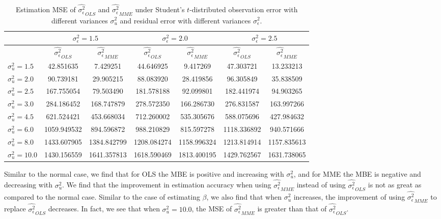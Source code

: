 \documentclass{article}
\begin{document}
\begin{table}[ht]
    \centering
    \caption{Estimation MSE of $\hat{\sigma^2_\epsilon}_{OLS}$ and $\hat{\sigma^2_\epsilon}_{MME}$ under Student's $t$-distributed observation error with different variances $\sigma^2_u$ and residual error with different variances $\sigma^2_\epsilon$.}
    \label{Tab:MSE_sigma_t}
    \begin{tabular}[t]{lcccccc}
        \hline
        &\multicolumn{2}{c}{$\sigma^2_\epsilon=1.5$}&\multicolumn{2}{c}{$\sigma^2_\epsilon=2.0$}&\multicolumn{2}{c}{$\sigma^2_\epsilon=2.5$}\\
        \hline
        &$\hat{\sigma^2_\epsilon}_{OLS}$&$\hat{\sigma^2_\epsilon}_{MME}$&$\hat{\sigma^2_\epsilon}_{OLS}$&
        $\hat{\sigma^2_\epsilon}_{MME}$&$\hat{\sigma^2_\epsilon}_{OLS}$&$\hat{\sigma^2_\epsilon}_{MME}$\\
        \hline
        $\sigma^2_u = 1.5$&42.851635&7.429251&44.646925&9.417269&47.303721&13.233213\\
        $\sigma^2_u = 2.0$&90.739181&29.905215&88.083920&28.419856&96.305849&35.838509\\
        $\sigma^2_u = 2.5$&167.755054&79.503490&181.578188&92.099801&182.441974&94.903265\\
        $\sigma^2_u = 3.0$&284.186452&168.747879&278.572350&166.286730&276.831587&163.997266\\
        $\sigma^2_u = 4.5$&621.524421&453.668034&712.260002&535.305676&588.075696&427.984632\\
        $\sigma^2_u = 6.0$&1059.949532&894.596872&988.210829&815.597278&1118.336892&940.571666\\
        $\sigma^2_u = 8.0$&1433.607905&1384.842799&1208.084274&1158.996324&1213.814914&1157.835613\\
        $\sigma^2_u = 10.0$&1430.156559&1641.357813&1618.590469&1813.400195&1429.762567&1631.738065\\
        \hline
    \end{tabular}
\end{table}

Similar to the normal case, we find that for OLS the MBE is positive and increasing with $\sigma^2_u$, and for MME the MBE is negative and decreasing with $\sigma^2_u$.
We find that the improvement in estimation accuracy when using $\hat{\sigma^2_\epsilon}_{MME}$ instead of using $\hat{\sigma^2_\epsilon}_{OLS}$ is not as great as compared to the normal case.
Similar to the case of estimating $\beta$, we also find that when $\sigma^2_u$ increases, the improvement of using $\hat{\sigma^2_\epsilon}_{MME}$ to replace $\hat{\sigma^2_\epsilon}_{OLS}$ decreases.
In fact, we see that when $\sigma^2_u = 10.0$, the MSE of $\hat{\sigma^2_\epsilon}_{MME}$ is greater than that of $\hat{\sigma^2_\epsilon}_{OLS}$. 
\end{document}
